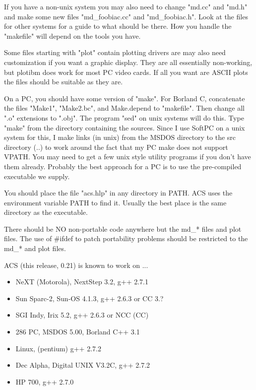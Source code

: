 If you have a non-unix system you may also need to change "md.cc"
and "md.h" and make some new files "md\_foobiac.cc" and "md\_foobiac.h".
Look at the files for other systems for a guide to what should be
there.  How you handle the "makefile" will depend on the tools
you have.

Some files starting with "plot" contain plotting drivers are may
also need customization if you want a graphic display.  They are
all essentially non-working, but plotibm does work for most PC
video cards.  If all you want are ASCII plots the files should be
suitable as they are.

On a PC, you should have some version of "make".  For Borland C,
concatenate the files "Make1", "Make2.bc", and Make.depend to
"makefile".  Then change all ".o" extensions to ".obj".  The program
"sed" on unix systems will do this.  Type "make" from the directory
containing the sources.  Since I use SoftPC on a unix system for
this, I make links (in unix) from the MSDOS directory to the src
directory (..) to work around the fact that my PC make does not
support VPATH.  You may need to get a few unix style utility programs
if you don't have them already.  Probably the best approach for a
PC is to use the pre-compiled executable we supply.

You should place the file "acs.hlp" in any directory in PATH.
ACS uses the environment variable PATH to find it.  Usually the
best place is the same directory as the executable.

There should be NO non-portable code anywhere but the md\_* files
and plot files.  The use of \#ifdef to patch portability problems
should be restricted to the md\_* and plot files.

ACS (this release, 0.21) is known to work on ...
\begin{itemize}
\item NeXT (Motorola), NextStep 3.2, g++ 2.7.1
\item Sun Sparc-2, Sun-OS 4.1.3, g++ 2.6.3 or CC 3.?
\item SGI Indy, Irix 5.2, g++ 2.6.3 or NCC (CC)
\item 286 PC, MSDOS 5.00, Borland C++ 3.1
\item Linux, (pentium) g++ 2.7.2
\item Dec Alpha, Digital UNIX V3.2C, g++ 2.7.2
\item HP 700, g++ 2.7.0
\end{itemize}
